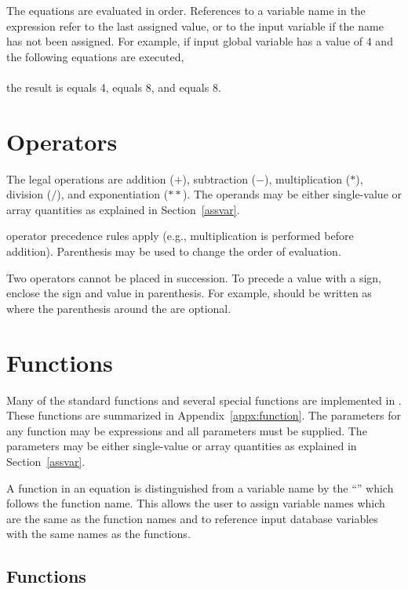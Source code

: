 The equations are evaluated in order. References to a variable name in
the expression refer to the last assigned value, or to the input
variable if the name has not been assigned. For example, if input global
variable  has a value of 4 and the following equations are
executed,
\cenlinesbegin
{} \\
 \\
\cenlinesend
the result is  equals 4,  equals 8, and  equals
8.

\section{Operators}

The legal operations are addition ($+$), subtraction ($-$),
multiplication ($*$), division ($/$), and exponentiation ($**$). The
operands may be either single-value or array quantities as explained in
Section~\ref{assvar}.

 operator precedence rules apply (e.g., multiplication is
performed before addition). Parenthesis may be used to change the order
of evaluation.

Two operators cannot be placed in succession. To precede a value with a
sign, enclose the sign and value in parenthesis. For example,
\cenlinesbegin
{}
\cenlinesend
should be written as
\cenlinesbegin
{}
\cenlinesend
where the parenthesis around the  are optional.

\section{Functions}

Many of the standard  functions and several special
functions are implemented in \caps{\PROGRAM}.
These functions are summarized in Appendix~\ref{appx:function}.
The parameters for any
function may be expressions and all parameters must be supplied. The
parameters may be either single-value or array quantities as explained
in Section~\ref{assvar}.

A function in an equation is distinguished from a variable name by the
``\cmd{(}'' which follows the function name. This allows the user to
assign variable names which are the same as the function names and to
reference input database variables with the same names as the functions.

\subsection*{ Functions}

